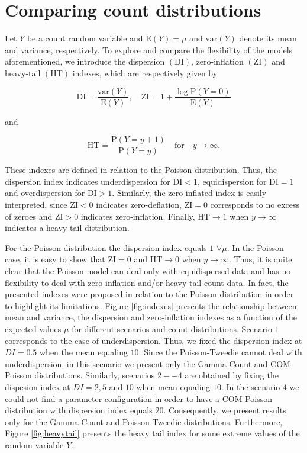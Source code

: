 \documentclass[9pt,a5paper,]{book}
\theoremstyle{definition}
\theoremstyle{definition}
\theoremstyle{remark}
\begin{document}
\section{Comparing count
distributions}\label{comparing-count-distributions}

Let \(Y\) be a count random variable and \(\mathrm{E}(Y) = \mu\) and
\(\mathrm{var}(Y)\) denote its mean and variance, respectively. To
explore and compare the flexibility of the models aforementioned, we
introduce the dispersion \((\mathrm{DI})\), zero-inflation
\((\mathrm{ZI})\) and heavy-tail \((\mathrm{HT})\) indexes, which are
respectively given by

\begin{equation}
\mathrm{DI} = \frac{\mathrm{var}(Y)}{\mathrm{E}(Y)}, \quad 
\mathrm{ZI} = 1 + \frac{\log \mathrm{P}(Y = 0)}{\mathrm{E}(Y)}
\end{equation}

and

\begin{equation}
\mathrm{HT} = \frac{\mathrm{P}(Y=y+1)}{\mathrm{P}(Y=y)}\quad \text{for} \quad y \to \infty. 
\end{equation}

These indexes are defined in relation to the Poisson distribution. Thus,
the dispersion index indicates underdispersion for \(\mathrm{DI} < 1\),
equidispersion for \(\mathrm{DI} = 1\) and overdispersion for
\(\mathrm{DI} > 1\). Similarly, the zero-inflated index is easily
interpreted, since \(\mathrm{ZI} < 0\) indicates zero-deflation,
\(\mathrm{ZI} = 0\) corresponds to no excess of zeroes and
\(\mathrm{ZI} > 0\) indicates zero-inflation. Finally,
\(\mathrm{HT} \to 1\) when \(y \to \infty\) indicates a heavy tail
distribution.

For the Poisson distribution the dispersion index equals \(1\)
\(\forall \mu\). In the Poisson case, it is easy to show that
\(\mathrm{ZI} = 0\) and \(\mathrm{HT} \to 0\) when \(y \to \infty\).
Thus, it is quite clear that the Poisson model can deal only with
equidispersed data and has no flexibility to deal with zero-inflation
and/or heavy tail count data. In fact, the presented indexes were
proposed in relation to the Poisson distribution in order to highlight
its limitations. Figure \ref{fig:indexes} presents the relationship
between mean and variance, the dispersion and zero-inflation indexes as
a function of the expected values \(\mu\) for different scenarios and
count distributions. Scenario \(1\) corresponds to the case of
underdispersion. Thus, we fixed the dispersion index at \(DI = 0.5\)
when the mean equaling \(10\). Since the Poisson-Tweedie cannot deal
with underdispersion, in this scenario we present only the Gamma-Count
and COM-Poisson distributions. Similarly, scenarios \(2--4\) are
obtained by fixing the dispesion index at \(DI = 2, 5\) and \(10\) when
mean equaling \(10\). In the scenario \(4\) we could not find a
parameter configuration in order to have a COM-Poisson distribution with
dispersion index equals \(20\). Consequently, we present results only
for the Gamma-Count and Poisson-Tweedie distributions. Furthermore,
Figure \ref{fig:heavytail} presents the heavy tail index for some
extreme values of the random variable \(Y\).
\end{document}
